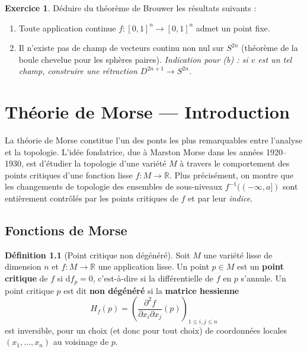 \documentclass[12pt,a4paper,openany]{book}
\theoremstyle{definition}
\newtheorem{definition}{Définition}[chapter]
\newtheorem{exercice}{Exercice}[chapter]
\theoremstyle{plain}
\theoremstyle{remark}
\newcommand{\R}{\mathbb{R}}
\newcommand{\dd}{\mathrm{d}}
\begin{document}
\begin{exercice}\label{exo:sard-10}
Déduire du théorème de Brouwer les résultats suivants :
\begin{enumerate}[label=(\alph*)]
  \item Toute application continue $f \colon [0,1]^n \to [0,1]^n$ admet un
  point fixe.
  \item Il n'existe pas de champ de vecteurs continu non nul sur $S^{2n}$
  (théorème de la boule chevelue pour les sphères paires).
  \textit{Indication pour (b) : si $v$ est un tel champ, construire une
  rétraction $D^{2n+1} \to S^{2n}$.}
\end{enumerate}
\end{exercice}


\chapter{Théorie de Morse --- Introduction}\label{chap:morse}
\minitoc

\vspace{1cm}

La théorie de Morse constitue l'un des ponts les plus
remarquables entre l'analyse et la topologie. L'idée fondatrice, due à Marston
Morse dans les années 1920--1930, est d'étudier la topologie d'une variété $M$
à travers le comportement des points critiques d'une fonction lisse
$f : M \to \R$. Plus précisément, on montre que les changements de topologie
des ensembles de sous-niveaux $f^{-1}((-\infty, a])$ sont entièrement contrôlés
par les points critiques de $f$ et par leur \emph{indice}.

\section{Fonctions de Morse}\label{sec:morse-fonctions}

\begin{definition}[Point critique non dégénéré]\label{def:point-critique-non-degenere}
Soit $M$ une variété lisse de dimension $n$ et $f : M \to \R$ une application
lisse. Un point $p \in M$ est un \textbf{point critique}
de $f$ si $\dd f_p = 0$, c'est-à-dire si la différentielle de $f$ en $p$
s'annule. Un point critique $p$ est dit \textbf{non dégénéré} si la
\textbf{matrice hessienne}
\[
  H_f(p) = \left(\frac{\partial^2 f}{\partial x_i \partial x_j}(p)\right)_{1 \leqslant i,j \leqslant n}
\]
est inversible, pour un choix (et donc pour tout choix) de coordonnées locales
$(x_1, \ldots, x_n)$ au voisinage de $p$.
\end{definition}
\end{document}

